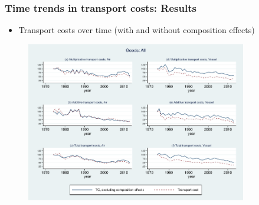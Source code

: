 \documentclass[10 pt,Helvetica, french]{beamer}
\begin{document}

\begin{frame}[label = slide_compeffects_figure]
\frametitle{Time trends in transport costs: Results}
\begin{itemize}
\item Transport costs over time (with and without composition effects)
\end{itemize}

\begin{figure}[htbp]
\begin{center}
\includegraphics[height=7cm]
{graph_composition_all.pdf}
\end{center}
\end{figure}
\hyperlink{app_compeffects_Hummels_rob}{} \hyperlink{slide_compeffects_results}{}
\end{frame}

\end{document}
